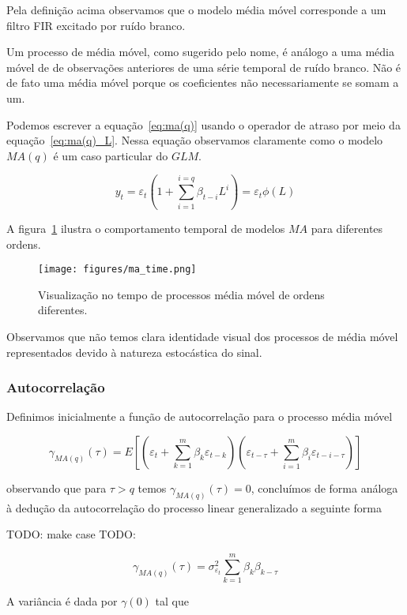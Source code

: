 Pela definição acima observamos que o modelo média móvel corresponde a um
filtro FIR excitado por ruído branco.

Um processo de média móvel, como sugerido pelo nome, é análogo a uma média
móvel de de observações anteriores de uma série temporal de ruído branco. Não
é de fato uma média móvel porque os coeficientes não necessariamente se somam a
um.

Podemos escrever a equação~\ref{eq:ma(q)} usando o operador de atraso por meio
da equação~\ref{eq:ma(q)_L}. Nessa equação observamos claramente como o modelo
$MA(q)$ é um caso particular do $GLM$.

\begin{equation}\label{eq:ma(q)_L}
    y_t = \varepsilon_t(1 + \sum_{i=1}^{i=q} \beta_{t-i} L^{i}) = \varepsilon_t \phi(L)
\end{equation}

A figura~\ref{fig:ma_time} ilustra o comportamento temporal de modelos $MA$ para
diferentes ordens.

\begin{figure}[H]
    \centering
    \texttt{[image: figures/ma\_time.png]}
    \caption{Visualização no tempo de processos média móvel de ordens
    diferentes.}
    \label{fig:ma_time}
\end{figure}

Observamos que não temos clara identidade visual dos processos de média móvel
representados devido à natureza estocástica do sinal.

\subsubsection{Autocorrelação}

Definimos inicialmente a função de autocorrelação para o processo média móvel

$$\gamma_{MA(q)}(\tau) = E\left[\left(\varepsilon_t + \sum^{m}_{k=1} \beta_k \varepsilon_{t-k}\right)\left( \varepsilon_{t-\tau} + \sum^{m}_{i=1} \beta_i \varepsilon_{t-i-\tau}\right) \right] $$

observando que para $\tau > q$ temos $\gamma_{MA(q)}(\tau) = 0$, concluímos de
forma análoga à dedução da autocorrelação do processo linear generalizado a
seguinte forma

TODO: make case
TODO:

$$\gamma_{MA(q)}(\tau) = \sigma_{\varepsilon_t}^2 \sum^{m}_{k=1} \beta_k\beta_{k-\tau} $$

A variância é dada por $\gamma(0)$ tal que

